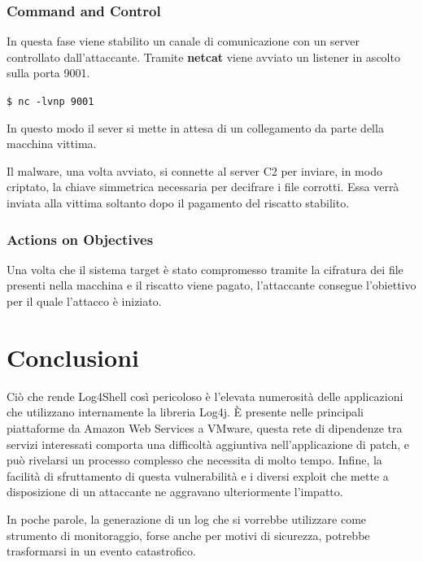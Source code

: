 \documentclass[a4paper, 12pt]{article}
\begin{document}
\subsubsection{Command and Control}
In questa fase viene stabilito un canale di comunicazione con un server controllato dall’attaccante. 
Tramite \textbf{netcat} viene avviato un listener in ascolto sulla porta 9001.
\begin{center}
    \verb!$ nc -lvnp 9001!
\end{center}
In questo modo il sever si mette in attesa di un collegamento da parte della macchina vittima.

Il malware, una volta avviato, si connette al server C2 per inviare, in modo criptato, la chiave simmetrica necessaria per decifrare i file corrotti. Essa verrà inviata alla vittima soltanto dopo il pagamento del riscatto stabilito.


\subsubsection{Actions on Objectives}
Una volta che il sistema target è stato compromesso tramite la cifratura dei file presenti nella macchina e il riscatto viene pagato, l'attaccante consegue l’obiettivo per il quale l’attacco è iniziato.

\newpage

\section{Conclusioni}
Ciò che rende Log4Shell così pericoloso è l'elevata numerosità delle applicazioni che utilizzano internamente la libreria Log4j.
È presente nelle principali piattaforme da Amazon Web Services a VMware, questa rete di dipendenze tra servizi interessati comporta una difficoltà aggiuntiva nell’applicazione di patch, e può rivelarsi un processo complesso che necessita di molto tempo.
Infine, la facilità di sfruttamento di questa vulnerabilità e i diversi exploit che mette a disposizione di un attaccante ne aggravano ulteriormente l’impatto. 

In poche parole, la generazione di un log che si vorrebbe utilizzare come strumento di monitoraggio, forse anche per motivi  di sicurezza, potrebbe trasformarsi in un evento catastrofico.

\newpage


\nocite{*}

\end{document}
